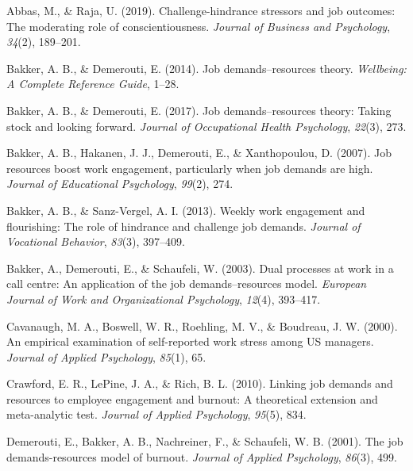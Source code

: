 \documentclass[
  man]{apa6}
\newlength{\cslhangindent}
\newlength{\cslentryspacingunit} %
\newenvironment{CSLReferences}[2] %
 {%
  \setlength{\parindent}{0pt}
  \ifodd #1
  \let\oldpar\par
  \def\par{\hangindent=\cslhangindent\oldpar}
  \fi
  \setlength{\parskip}{#2\cslentryspacingunit}
 }%
 {}
\begin{document}
\hypertarget{refs}{}
\begin{CSLReferences}{1}{0}
\leavevmode{}%
Abbas, M., \& Raja, U. (2019). Challenge-hindrance stressors and job outcomes: The moderating role of conscientiousness. \emph{Journal of Business and Psychology}, \emph{34}(2), 189--201.

\leavevmode{}%
Bakker, A. B., \& Demerouti, E. (2014). Job demands--resources theory. \emph{Wellbeing: A Complete Reference Guide}, 1--28.

\leavevmode{}%
Bakker, A. B., \& Demerouti, E. (2017). Job demands--resources theory: Taking stock and looking forward. \emph{Journal of Occupational Health Psychology}, \emph{22}(3), 273.

\leavevmode{}%
Bakker, A. B., Hakanen, J. J., Demerouti, E., \& Xanthopoulou, D. (2007). Job resources boost work engagement, particularly when job demands are high. \emph{Journal of Educational Psychology}, \emph{99}(2), 274.

\leavevmode{}%
Bakker, A. B., \& Sanz-Vergel, A. I. (2013). Weekly work engagement and flourishing: The role of hindrance and challenge job demands. \emph{Journal of Vocational Behavior}, \emph{83}(3), 397--409.

\leavevmode{}%
Bakker, A., Demerouti, E., \& Schaufeli, W. (2003). Dual processes at work in a call centre: An application of the job demands--resources model. \emph{European Journal of Work and Organizational Psychology}, \emph{12}(4), 393--417.

\leavevmode{}%
Cavanaugh, M. A., Boswell, W. R., Roehling, M. V., \& Boudreau, J. W. (2000). An empirical examination of self-reported work stress among US managers. \emph{Journal of Applied Psychology}, \emph{85}(1), 65.

\leavevmode{}%
Crawford, E. R., LePine, J. A., \& Rich, B. L. (2010). Linking job demands and resources to employee engagement and burnout: A theoretical extension and meta-analytic test. \emph{Journal of Applied Psychology}, \emph{95}(5), 834.

\leavevmode{}%
Demerouti, E., Bakker, A. B., Nachreiner, F., \& Schaufeli, W. B. (2001). The job demands-resources model of burnout. \emph{Journal of Applied Psychology}, \emph{86}(3), 499.


\end{CSLReferences}
\end{document}
